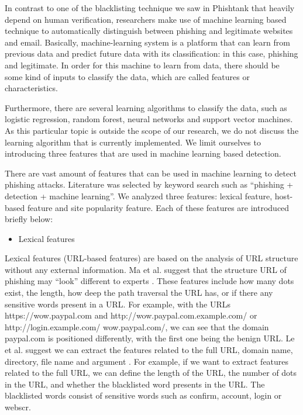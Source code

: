 In contrast to one of the blacklisting technique we saw in Phishtank
that heavily depend on human verification, researchers make use of
machine learning based technique to automatically distinguish between
phishing and legitimate websites and email. Basically, machine-learning
system is a platform that can learn from previous data and predict
future data with its classification: in this case, phishing and legitimate.
In order for this machine to learn from data, there should be some
kind of inputs to classify the data, which are called features or
characteristics.

Furthermore, there are several learning algorithms to classify the
data, such as logistic regression, random forest, neural networks
and support vector machines. As this particular topic is outside the
scope of our research, we do not discuss the learning algorithm that
is currently implemented. We limit ourselves to introducing three
features that are used in machine learning based detection.

There are vast amount of features that can be used in machine learning
to detect phishing attacks. Literature was selected by keyword search
such as ``phishing + detection + machine learning''. We analyzed
three features: lexical feature, host-based feature and site popularity
feature. Each of these features are introduced briefly below:
\begin{itemize}
\item Lexical features
\end{itemize}
Lexical features (URL-based features) are based on the analysis of
URL structure without any external information. Ma et al. suggest
that the structure URL of phishing may \textquotedblleft look\textquotedblright{}
different to experts \citep{ma:2009}. These features include how
many dots exist, the length, how deep the path traversal the URL has,
or if there any sensitive words present in a URL. For example, with
the URLs https://wow.paypal.com and http://wow.paypal.com.example.com/
or http://login.example.com/ wow.paypal.com/, we can see that the
domain paypal.com is positioned differently, with the first one being
the benign URL. Le et al. suggest we can extract the features related
to the full URL, domain name, directory, file name and argument \citep{le:2011}.
For example, if we want to extract features related to the full URL,
we can define the length of the URL, the number of dots in the URL,
and whether the blacklisted word presents in the URL. The blacklisted
words consist of sensitive words such as confirm, account, login or
webscr.

